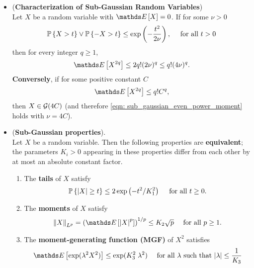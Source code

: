 \documentclass[11pt]{article}
\begin{document}
\begin{itemize}
\item \begin{proposition} (\textbf{Characterization of Sub-Gaussian Random Variables})  \citep{boucheron2013concentration}\\
Let $X$ be a random variable with $\E{}{X} = 0$. If for some $\nu > 0$
\begin{align}
{\mathbb P}\left\{X > t\right\} \lor  {\mathbb P}\left\{-X > t\right\} \le \exp\left(-\frac{t^2}{2\nu}\right), \quad \text{ for all } t > 0   \label{eqn: sub_gaussian_def_2}
\end{align}
then for every integer $q \ge 1$,
\begin{align}
\E{}{X^{2q}} \le 2q! (2\nu)^q \le q! (4\nu)^q. \label{eqn: sub_gaussian_even_power_moment}
\end{align}
\textbf{Conversely}, if for some positive constant $C$
\begin{align*}
\E{}{X^{2q}} \le  q! C^q,
\end{align*} then $X \in {\mathcal G}(4C)$ (and therefore \eqref{eqn: sub_gaussian_even_power_moment} holds with $\nu = 4C$).
\end{proposition}

\item \begin{proposition} (\textbf{Sub-Gaussian properties}).  \citep{vershynin2018high}\\
Let $X$ be a random variable. Then the following properties are \textbf{equivalent}; the parameters $K_i > 0$ appearing in these
properties differ from each other by at most an absolute constant factor.
\begin{enumerate}
\item The \textbf{tails} of $X$ satisfy
\begin{align*}
{\mathbb P}\left\{\left\lvert X \right\rvert \ge t\right\} \le 2 \exp\left(-t^2/K_1^2\right)\quad\text{ for all }t \ge 0.
\end{align*}

\item The \textbf{moments} of $X$ satisfy
\begin{align*}
\norm{X}{L^p} = \paren{\E{}{\abs{X}^p}}^{1/p} \le K_2 \sqrt{p}\quad \text{ for all }p \ge 1.
\end{align*}

\item The \textbf{moment-generating function (MGF)} of $X^2$ satisfies
\begin{align*}
\E{}{\exp(\lambda^2 X^2)} \le \exp(K_3^2 \;\lambda^2) \quad \text{ for all $\lambda$ such that $\abs{\lambda} \le \frac{1}{K_3}$}
\end{align*}


\end{enumerate}
\end{proposition}
\end{itemize}
\end{document}
